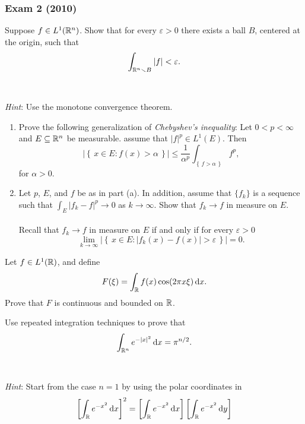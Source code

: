 \subsubsection{Exam 2 (2010)}
\setcounter{exercise}{0}
\setcounter{equation}{0}

\begin{problem}
  Suppose \(f\in L^1(\mathbb{R}^n)\). Show that for every \(\varepsilon>0\) there
  exists a ball \(B\), centered at the origin, such that
  \[
    \int_{\mathbb{R}^n\smallsetminus B}|f|<\varepsilon.
  \]
  \\\\
  \emph{Hint}: Use the monotone convergence theorem.
\end{problem}
\begin{solution}
\end{solution}
\begin{problem}
  \hfill
  \begin{enumerate}[label=(\alph*)]
  \item Prove the following generalization of \emph{Chebyshev's
      inequality}: Let \(0<p<\infty\) and \(E\subseteq\mathbb{R}^n\) be
    measurable. assume that \(|f|^p\in L^1(E)\). Then
    \[
      \left|\left\{\,x\in E:f( x )>\alpha\,\right\}\right|
      \leq\frac{1}{\alpha^p}\int_{\left\{\,f>\alpha\,\right\}}f^p,
    \]
    for \(\alpha>0\).
  \item Let \(p\), \(E\), and \(f\) be as in part (a). In addition, assume
    that \(\{f_k\}\) is a sequence such that \(\int_E|f_k-f|^p\to 0\) as
    \(k\to\infty\). Show that \(f_k\to f\) in measure on \(E\).
    \\\\
    Recall that \(f_k\to f\) in measure on \(E\) if and only if for every
    \(\varepsilon>0\)
    \[
      \lim_{k\to\infty}\left|\left\{\, x \in E:|f_k( x )-f( x
          )|>\varepsilon\,\right\}\right|=0.
    \]
\end{enumerate}
\end{problem}
\begin{solution}
\end{solution}

\begin{problem}
  Let \(f\in L^1(\mathbb{R})\), and define
  \[
    F(\xi)=\int_{\mathbb{R}} f(x)\cos(2\pi x\xi)\mathop{}\!\mathrm{d} x.
  \]
  Prove that \(F\) is continuous and bounded on \(\mathbb{R}\).
\end{problem}
\begin{solution}
\end{solution}

\begin{problem}
  Use repeated integration techniques to prove that
  \[
    \int_{\mathbb{R}^n} e^{-| x |^2}\mathop{}\!\mathrm{d} x=\pi^{n/2}.
  \]
  \\\\
  \emph{Hint}: Start from the case \(n=1\) by using the polar coordinates
  in
  \[
    \left[\int_{\bbR} e^{-x^2}\diff x\right]^2=%
    \left[\int_{\bbR} e^{-x^2}\diff x\right]%
    \left[\int_{\bbR} e^{-x^2}\diff y\right]%
  \]
\end{problem}
\begin{solution}
\end{solution}

\begin{problem}
\end{problem}
\begin{solution}
\end{solution}

